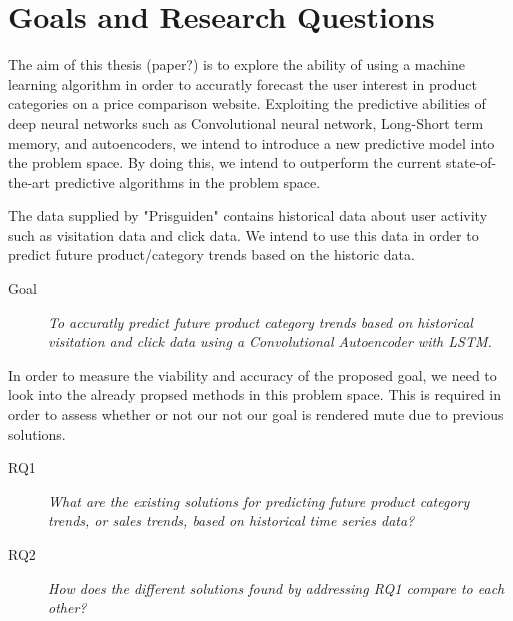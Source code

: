 \section{Goals and Research Questions}
\label{section:Introduction:Goal}


The aim of this thesis (paper?) is to explore the ability of using a machine learning algorithm in order to accuratly forecast the user interest in product categories on a price comparison website.
Exploiting the predictive abilities of deep neural networks such as Convolutional neural network, Long-Short term memory, and autoencoders,
we intend to introduce a new predictive model into the problem space.
By doing this, we intend to outperform the current state-of-the-art predictive algorithms in the problem space.

The data supplied by "Prisguiden" contains historical data about user activity such as visitation data and click data.
We intend to use this data in order to predict future product/category trends based on the historic data.

\begin{description}
    \item[Goal]{\it To accuratly predict future product category trends based on historical visitation and click data using a Convolutional Autoencoder with LSTM.}
\end{description}

In order to measure the viability and accuracy of the proposed goal, we need to look into the already propsed methods in this problem space.
This is required in order to assess whether or not our not our goal is rendered mute due to previous solutions.


\begin{description}
    \item[RQ1]{\it What are the existing solutions for predicting future product category trends, or sales trends, based on historical time series data?}
\end{description}

\begin{description}
    \item[RQ2]{\it How does the different solutions found by addressing RQ1 compare to each other?} 
\end{description}

